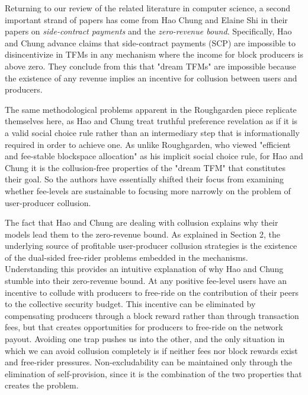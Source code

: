 \documentclass[sigconf,anonymous]{aamas}
\begin{document}
Returning to our review of the related literature in computer science, a second important strand of papers has come from Hao Chung and Elaine Shi in their papers on \textit{side-contract payments} and the \textit{zero-revenue bound}. Specifically, Hao and Chung advance claims that side-contract payments (SCP) are impossible to disincentivize in TFMs in any mechanism where the income for block producers is above zero. They conclude from this that "dream TFMs" are impossible because the existence of any revenue implies an incentive for collusion between users and producers.

The same methodological problems apparent in the Roughgarden piece replicate themselves here, as Hao and Chung treat truthful preference revelation as if it is a valid social choice rule rather than an intermediary step that is informationally required in order to achieve one. As unlike Roughgarden, who viewed "efficient and fee-stable blockspace allocation" as his implicit social choice rule, for Hao and Chung it is the collusion-free properties of the "dream TFM" that constitutes their goal. So the authors have essentially shifted their focus from examining whether fee-levels are sustainable to focusing more narrowly on the problem of user-producer collusion.

The fact that Hao and Chung are dealing with collusion explains why their models lead them to the zero-revenue bound. As explained in Section 2, the underlying source of profitable user-producer collusion strategies is the existence of the dual-sided free-rider problems embedded in the mechanisms. Understanding this provides an intuitive explanation of why Hao and Chung stumble into their zero-revenue bound. At any positive fee-level users have an incentive to collude with producers to free-ride on the contribution of their peers to the collective security budget. This incentive can be eliminated by compensating producers through a block reward rather than through transaction fees, but that creates opportunities for producers to free-ride on the network payout. Avoiding one trap pushes us into the other, and the only situation in which we can avoid collusion completely is if neither fees nor block rewards exist and free-rider pressures. Non-excludability can be maintained only through the elimination of self-provision, since it is the combination of the two properties that creates the problem.
\end{document}
